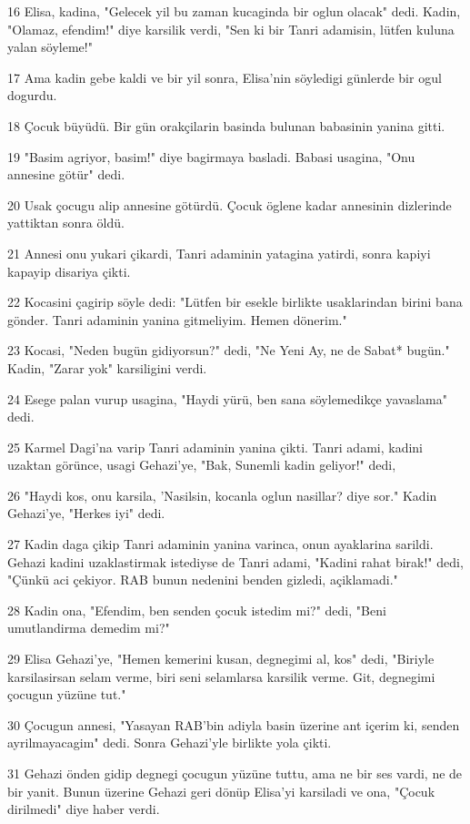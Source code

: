 \par 16 Elisa, kadina, "Gelecek yil bu zaman kucaginda bir oglun olacak" dedi. Kadin, "Olamaz, efendim!" diye karsilik verdi, "Sen ki bir Tanri adamisin, lütfen kuluna yalan söyleme!"
\par 17 Ama kadin gebe kaldi ve bir yil sonra, Elisa'nin söyledigi günlerde bir ogul dogurdu.
\par 18 Çocuk büyüdü. Bir gün orakçilarin basinda bulunan babasinin yanina gitti.
\par 19 "Basim agriyor, basim!" diye bagirmaya basladi. Babasi usagina, "Onu annesine götür" dedi.
\par 20 Usak çocugu alip annesine götürdü. Çocuk öglene kadar annesinin dizlerinde yattiktan sonra öldü.
\par 21 Annesi onu yukari çikardi, Tanri adaminin yatagina yatirdi, sonra kapiyi kapayip disariya çikti.
\par 22 Kocasini çagirip söyle dedi: "Lütfen bir esekle birlikte usaklarindan birini bana gönder. Tanri adaminin yanina gitmeliyim. Hemen dönerim."
\par 23 Kocasi, "Neden bugün gidiyorsun?" dedi, "Ne Yeni Ay, ne de Sabat* bugün." Kadin, "Zarar yok" karsiligini verdi.
\par 24 Esege palan vurup usagina, "Haydi yürü, ben sana söylemedikçe yavaslama" dedi.
\par 25 Karmel Dagi'na varip Tanri adaminin yanina çikti. Tanri adami, kadini uzaktan görünce, usagi Gehazi'ye, "Bak, Sunemli kadin geliyor!" dedi,
\par 26 "Haydi kos, onu karsila, 'Nasilsin, kocanla oglun nasillar? diye sor." Kadin Gehazi'ye, "Herkes iyi" dedi.
\par 27 Kadin daga çikip Tanri adaminin yanina varinca, onun ayaklarina sarildi. Gehazi kadini uzaklastirmak istediyse de Tanri adami, "Kadini rahat birak!" dedi, "Çünkü aci çekiyor. RAB bunun nedenini benden gizledi, açiklamadi."
\par 28 Kadin ona, "Efendim, ben senden çocuk istedim mi?" dedi, "Beni umutlandirma demedim mi?"
\par 29 Elisa Gehazi'ye, "Hemen kemerini kusan, degnegimi al, kos" dedi, "Biriyle karsilasirsan selam verme, biri seni selamlarsa karsilik verme. Git, degnegimi çocugun yüzüne tut."
\par 30 Çocugun annesi, "Yasayan RAB'bin adiyla basin üzerine ant içerim ki, senden ayrilmayacagim" dedi. Sonra Gehazi'yle birlikte yola çikti.
\par 31 Gehazi önden gidip degnegi çocugun yüzüne tuttu, ama ne bir ses vardi, ne de bir yanit. Bunun üzerine Gehazi geri dönüp Elisa'yi karsiladi ve ona, "Çocuk dirilmedi" diye haber verdi.
